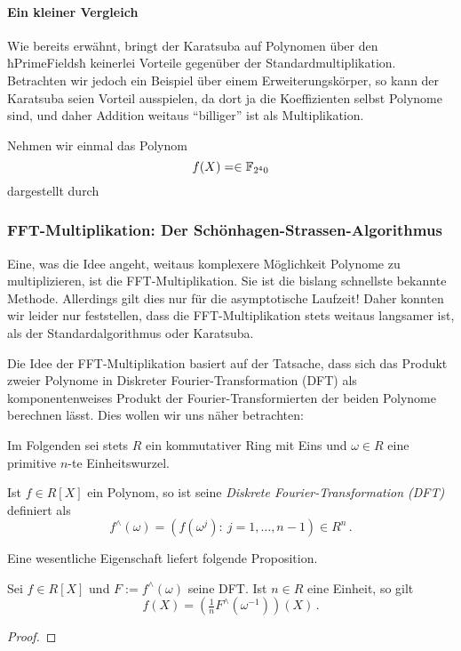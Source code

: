 \paragraph{Ein kleiner Vergleich}
Wie bereits erwähnt, bringt der Karatsuba auf Polynomen über den ħPrimeFieldsħ
keinerlei Vorteile gegenüber der Standardmultiplikation. Betrachten wir jedoch
ein Beispiel über einem Erweiterungskörper, so kann der Karatsuba seien Vorteil
ausspielen, da dort ja die Koeffizienten selbst Polynome sind, und daher
Addition weitaus "`billiger"' ist als Multiplikation.
\begin{beispiel}
  Nehmen wir einmal das Polynom 
  \[ f(X) = \in \mathbb{F}_{2^40}\]
  dargestellt durch
\end{beispiel}

\subsubsection{FFT-Multiplikation: Der Schönhagen-Strassen-Algorithmus}
Eine, was die Idee angeht, weitaus komplexere Möglichkeit Polynome zu
multiplizieren, ist die FFT-Multiplikation. Sie ist die bislang schnellste
bekannte Methode. Allerdings gilt dies nur für die asymptotische Laufzeit!
Daher konnten wir leider nur feststellen, dass die FFT-Multiplikation stets
weitaus langsamer ist, als der Standardalgorithmus oder Karatsuba.

Die Idee der FFT-Multiplikation basiert auf der Tatsache, dass sich das Produkt
zweier Polynome in Diskreter Fourier-Transformation (DFT) als komponentenweises
Produkt der Fourier-Transformierten der beiden Polynome berechnen lässt. 
Dies wollen wir uns näher betrachten:

Im Folgenden sei stets $R$ ein kommutativer Ring mit Eins und 
$\omega\in R$ eine primitive $n$-te Einheitswurzel.

\begin{definition}
   Ist $f\in R[X]$ ein Polynom, so ist seine
  \emph{Diskrete Fourier-Transformation (DFT)} definiert als
  \[ f^\wedge(\omega) = (f(\omega^j):\ j=1,\ldots,n-1) \in R^n\,.\]
\end{definition}

Eine wesentliche Eigenschaft liefert folgende Proposition. 

\begin{prop}
  Sei $f \in R[X]$ und $F := f^\wedge(\omega)$ seine DFT. Ist 
  $n \in R$ eine Einheit, so gilt
  \[ f(X) = (\tfrac 1 n F^\wedge(\omega^{-1}))(X) \,.\]
\end{prop}
\begin{proof}
  
\end{proof}

